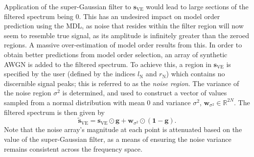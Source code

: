 Application of the
super-Gaussian filter to $\symbf{s}_{\text{VE}}$
would lead to large sections of the filtered spectrum being $0$. This has an
undesired impact on model order prediction using the \ac{MDL}, as noise that
resides within the filter region will now seem to resemble true signal,
as its amplitude is infinitely greater than the zeroed regions. A massive
over-estimation of model order results from this.
In order to obtain better predictions from model order selection, an array of
synthetic \ac{AWGN} is
added to the filtered spectrum. To achieve this, a region in
$\symbf{s}_{\text{VE}}$ is specified by the user (defined by the indices
$l_{\text{N}}$ and  $r_{\text{N}}$) which contains no discernible
signal peaks; this is referred to as the \emph{noise region}. The variance of
the noise region $\sigma^2$ is determined, and used to construct a vector of
values sampled from a normal distribution with mean $0$ and variance
$\sigma^2$, $\symbf{w}_{\sigma^2} \in \mathbb{R}^{2N}$.
The filtered spectrum is then given by
\begin{equation}
    \widetilde{\symbf{s}}_{\text{VE}} = \symbf{s}_{\text{VE}} \odot \symbf{g} + \symbf{w}_{\sigma^2} \odot \left(\symbf{1} - \symbf{g} \right).
    \label{eq:Sve-tilde}
\end{equation}
Note that the noise array's magnitude at each point is attenuated based on the
value of the super-Gaussian filter, as a means of ensuring the noise variance
remains consistent across the frequency space.

